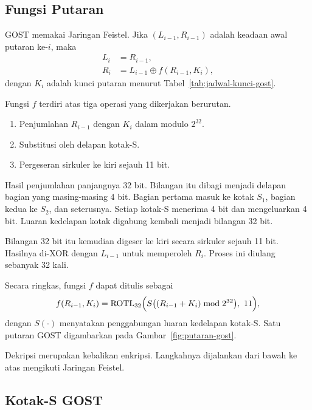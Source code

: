 \subsection{Fungsi Putaran}

GOST memakai Jaringan Feistel. Jika $(L_{i-1}, R_{i-1})$ adalah keadaan awal
putaran ke-$i$, maka
\begin{equation}
\begin{aligned}
L_i &= R_{i-1}, \\
R_i &= L_{i-1} \oplus f(R_{i-1}, K_i),
\end{aligned}
\label{eq:putaran-gost}
\end{equation}
dengan $K_i$ adalah kunci putaran menurut Tabel~\ref{tab:jadwal-kunci-gost}.

Fungsi $f$ terdiri atas tiga operasi yang dikerjakan berurutan.
\begin{enumerate}
    \item Penjumlahan $R_{i-1}$ dengan $K_i$ dalam modulo $2^{32}$.
    \item Substitusi oleh delapan kotak-S.
    \item Pergeseran sirkuler ke kiri sejauh 11 bit.
\end{enumerate}

Hasil penjumlahan panjangnya 32 bit. Bilangan itu dibagi menjadi delapan bagian
yang masing-masing 4 bit. Bagian pertama masuk ke kotak $S_1$, bagian kedua ke
$S_2$, dan seterusnya. Setiap kotak-S menerima 4 bit dan mengeluarkan 4 bit.
Luaran kedelapan kotak digabung kembali menjadi bilangan 32 bit.

Bilangan 32 bit itu kemudian digeser ke kiri secara sirkuler sejauh 11 bit.
Hasilnya di-XOR dengan $L_{i-1}$ untuk memperoleh $R_i$. Proses ini diulang
sebanyak 32 kali.

Secara ringkas, fungsi $f$ dapat ditulis sebagai
\begin{equation}
f(R_{i-1}, K_i) = \mathrm{ROTL}_{32}\Bigl( S\bigl( (R_{i-1} + K_i) \bmod 2^{32} \bigr),\ 11 \Bigr),
\label{eq:fungsi-f-gost}
\end{equation}
dengan $S(\cdot)$ menyatakan penggabungan luaran kedelapan kotak-S. Satu putaran
GOST digambarkan pada Gambar~\ref{fig:putaran-gost}.



Dekripsi merupakan kebalikan enkripsi. Langkahnya dijalankan dari bawah ke atas
mengikuti Jaringan Feistel.

\subsection{Kotak-S GOST}


